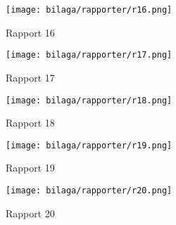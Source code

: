 \begin{figure}[H]
  \centering
  \texttt{[image: bilaga/rapporter/r16.png]}
  \caption{Rapport 16}
\end{figure}

\begin{figure}[H]
  \centering
  \texttt{[image: bilaga/rapporter/r17.png]}
  \caption{Rapport 17}
\end{figure}

\begin{figure}[H]
  \centering
  \texttt{[image: bilaga/rapporter/r18.png]}
  \caption{Rapport 18}
\end{figure}

\begin{figure}[H]
  \centering
  \texttt{[image: bilaga/rapporter/r19.png]}
  \caption{Rapport 19}
\end{figure}

\begin{figure}[H]
  \centering
  \texttt{[image: bilaga/rapporter/r20.png]}
  \caption{Rapport 20}
\end{figure}